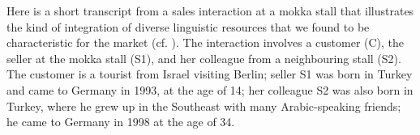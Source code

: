 Here is a short transcript from a sales interaction at a mokka stall that illustrates the kind of integration of diverse linguistic resources that we found to be characteristic for the market (cf. \cite{YükselDuman2021}). The interaction involves a customer (C), the seller at the mokka stall (S1), and her colleague from a neighbouring stall (S2). The customer is a tourist from Israel visiting Berlin; seller S1 was born in Turkey and came to Germany in 1993, at the age of 14; her colleague S2 was also born in Turkey, where he grew up in the Southeast with many Arabic-speaking friends; he came to Germany in 1998 at the age of 34.

\renewcommand{\exfont}{\itshape}
